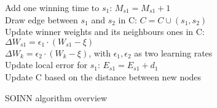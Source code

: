\begin{algorithm}
    {Add one winning time to $s_1$: $M_{s1} = M_{s1} + 1$ \\
    Draw edge between $s_1$ and $s_2$ in C: $C = C \cup (s_1,s_2)$ \\
    Update winner weights and its neighbours ones in C: \\
    $\Delta W_{s1} = \epsilon_1 \cdot (W_{s1} - \xi)$ \\
    $\Delta W_k = \epsilon_2 \cdot (W_k - \xi)$, with $\epsilon_1, \epsilon_2$ as two learning rates \\
    Update local error for $s_1$: $E_{s1} = E_{s1} + d_1$ \\
    Update C based on the distance between new nodes \\
    }
    \caption{SOINN algorithm overview}
\end{algorithm}